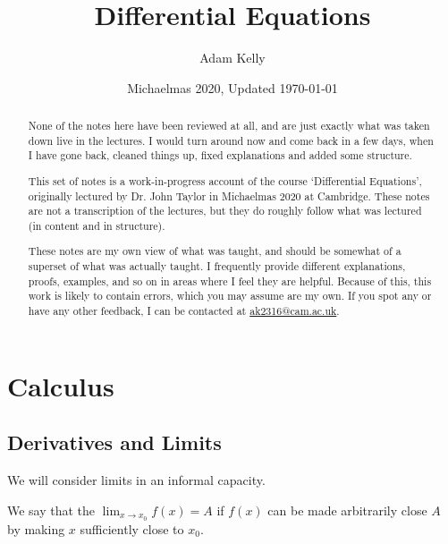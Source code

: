 \documentclass[a4]{scrartcl}
\title{Differential Equations}
\author{Adam Kelly}
\date{Michaelmas 2020, Updated \today}
\begin{document}
\maketitle

\begin{abstract}\vspace{2\baselineskip}
	{\color{red} None of the notes here have been reviewed at all, and are just exactly what was taken down live in the lectures. I would turn around now and come back in a few days, when I have gone back, cleaned things up, fixed explanations and added some structure.}
	\vspace{5\baselineskip}

	This set of notes is a work-in-progress account of the course `Differential Equations', originally lectured by Dr. John Taylor in Michaelmas 2020 at Cambridge. These notes are not a transcription of the lectures, but they do roughly follow what was lectured (in content and in structure).

	These notes are my own view of what was taught, and should be somewhat of a superset of what was actually taught. I frequently provide different explanations, proofs, examples, and so on in areas where I feel they are helpful. Because of this, this work is likely to contain errors, which you may assume are my own. If you spot any or have any other feedback, I can be contacted at \href{mailto:ak2316@cam.ac.uk}{ak2316@cam.ac.uk}.

\end{abstract}

\tableofcontents

\clearpage

\section{Calculus}

\subsection{Derivatives and Limits}

We will consider limits in an informal capacity.

\begin{definition}[Limits]
	We say that the  $\lim_{x \to x_0} f(x) = A$ if $f(x)$ can be made arbitrarily close $A$ by making $x$ sufficiently close to $x_0$.
\end{definition}
\end{document}
